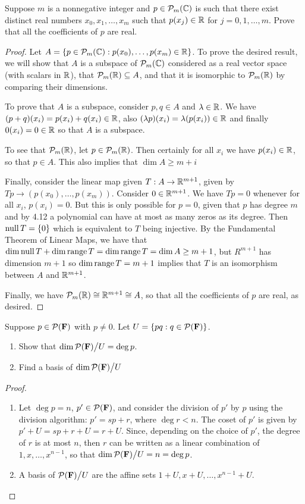 \begin{exercise}{10}
  Suppose $m$ is a nonnegative integer and $p\in\mathcal{P}_m(\mathbb{C})$ is such that there exist distinct real numbers $x_0,x_1,\dots,x_m$ such that $p(x_j)\in\mathbb{R}$ for $j=0,1,\dots,m$. Prove that all the coefficients of $p$ are real.
\end{exercise}
\begin{proof}
 Let $A=\{p\in\mathcal{P}_m(\mathbb{C}): p(x_0),\dots,p(x_m)\in\mathbb{R}\}$. To prove the desired result, we will show that $A$ is a subspace of $\mathcal{P}_m(\mathbb{C})$ considered as a real vector space (with scalars in $\mathbb{R}$), that $\mathcal{P}_m(\mathbb{R})\subseteq A$, and that it is isomorphic to $\mathcal{P}_m(\mathbb{R})$ by comparing their dimensions.

 To prove that $A$ is a subspace, consider $p,q\in A$ and $\lambda\in\mathbb{R}$. We have $(p+q)(x_i)=p(x_i)+q(x_i)\in\mathbb{R}$, also $(\lambda p)(x_i)=\lambda(p(x_i))\in\mathbb{R}$ and finally $0(x_i)=0\in\mathbb{R}$ so that $A$ is a subspace.

 To see that $\mathcal{P}_m(\mathbb{R})$, let $p\in\mathcal{P}_m(\mathbb{R})$. Then certainly for all $x_i$ we have $p(x_i)\in\mathbb{R}$, so that $p\in A$. This also implies that $\dim A\geq m+i$

 Finally, consider the linear map given $T:A\rightarrow \mathbb{R}^{m+1}$, given by $Tp\rightarrow (p(x_0),\dots,p(x_m))$. Consider $0\in\mathbb{R}^{m+1}$. We have $Tp=0$ whenever for all $x_i$, $p(x_i)=0$. But this is only possible for $p=0$, given that $p$ has degree $m$ and by 4.12 a polynomial can have at most as many zeros as its degree. Then $\operatorname*{null} T=\{0\}$ which is equivalent to $T$ being injective. By the Fundamental Theorem of Linear Maps, we have that $\dim\operatorname*{null} T+\dim\operatorname*{range} T=\dim\operatorname*{range} T=\dim A\geq m+1$, but $R^{m+1}$ has dimension $m+1$ so $\dim\operatorname*{range} T= m+1$ implies that $T$ is an isomorphism between $A$ and $\mathbb{R}^{m+1}$. 
 
 Finally, we have $\mathcal{P}_m(\mathbb{R})\cong\mathbb{R}^{m+1}\cong A$, so that all the coefficients of $p$ are real, as desired.
\end{proof}

\begin{exercise}{11}
Suppose $p\in\mathcal{P}(\mathbf{F})$ with $p\neq 0$. Let $U=\{pq:q\in\mathcal{P}(\mathbf{F})\}$.
\begin{enumerate}
    \item Show that $\dim{\textstyle \mathcal{P}(\mathbf{F})}\big/{\textstyle U}=\deg p$.
    \item Find a basis of $\dim{\textstyle \mathcal{P}(\mathbf{F})}\big/{\textstyle U}$
\end{enumerate}
\end{exercise}
\begin{proof}
 \begin{enumerate}
     \item Let $\deg p=n$, $p'\in\mathcal{P}(\mathbf{F})$, and consider the division of $p'$ by $p$ using the division algorithm: $p'=sp+r$, where $\deg r<n$. The coset of $p'$ is given by $p'+U=sp+r+U=r+U$. Since, depending on the choice of $p'$, the degree of $r$ is at most $n$, then $r$ can be written as a linear combination of $1,x,\dots,x^{n-1}$, so that $\dim{\textstyle \mathcal{P}(\mathbf{F})}\big/{\textstyle U}=n=\deg p$.
     \item A basis of ${\textstyle \mathcal{P}(\mathbf{F})}\big/{\textstyle U}$ are the affine sets $1+U,x+U,\dots,x^{n-1}+U$. 
 \end{enumerate}
\end{proof}
